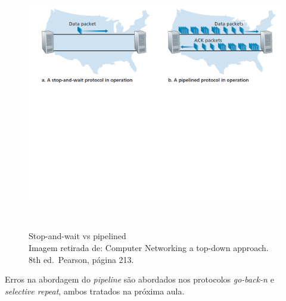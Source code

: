 \begin{figure}[h!]
\centering
\includegraphics[keepaspectratio, width=14cm, height=11cm]{imagens/11/11 - stop and wait vs pipelined.png}
\caption{Stop-and-wait vs pipelined  \\
Imagem retirada de: Computer Networking a top-down approach. 8th
ed.~Pearson, página 213. \\}
\label{Stop-and-wait vs pipelined}
\end{figure}

Erros na abordagem do \emph{pipeline} são abordados nos protocolos
\emph{go-back-n} e \emph{selective repeat}, ambos tratados na próxima
aula.